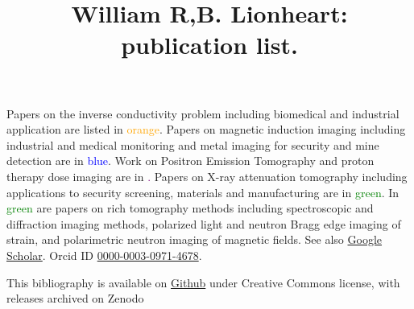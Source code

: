 \documentclass{article}
\title{William R,B. Lionheart: publication list.}
\begin{document}
\maketitle
Papers on the inverse conductivity problem including biomedical and industrial application are listed in \textcolor{orange}{orange}.  Papers on magnetic induction imaging including industrial and medical  monitoring and metal imaging for security and mine detection are in \textcolor{blue}{blue}.  Work on Positron Emission Tomography and proton therapy dose imaging are in \textcolor{purple}. Papers on X-ray attenuation tomography including applications to security screening, materials and manufacturing are in \textcolor{green}{green}. In \textcolor{green}{green} are papers on rich tomography methods including spectroscopic and diffraction imaging methods, polarized light and neutron Bragg edge imaging of strain, and polarimetric neutron imaging of magnetic fields. See also \href{https://scholar.google.com/citations?user=S1QF1uQAAAAJ&hl=en}{Google Scholar}. Orcid ID \href{https://orcid.org/0000-0003-0971-4678}{0000-0003-0971-4678}.

	\begin{refsection}
		\nocite{*} 
		\printbibliography[resetnumbers=true,
		title={References reverse chronological order}]   
	\end{refsection}

\small{This bibliography is available on \href{https://github.com/billlion/lionheartbibliography}{Github} under Creative Commons license, with releases archived on Zenodo}

\versionBox
\end{document}
